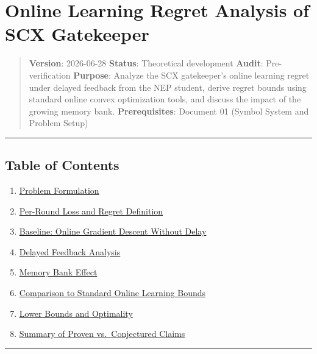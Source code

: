 \documentclass[
  12pt,
]{article}
\author{SCX}
\date{2026}
\providecommand{\tightlist}{%
  \setlength{\itemsep}{0pt}\setlength{\parskip}{0pt}}
\begin{document}
\section{Online Learning Regret Analysis of SCX
Gatekeeper}\label{online-learning-regret-analysis-of-scx-gatekeeper}

\begin{quote}
\textbf{Version}: 2026-06-28 \textbar{} \textbf{Status}: Theoretical
development \textbar{} \textbf{Audit}: Pre-verification
\textbf{Purpose}: Analyze the SCX gatekeeper's online learning regret
under delayed feedback from the NEP student, derive regret bounds using
standard online convex optimization tools, and discuss the impact of the
growing memory bank. \textbf{Prerequisites}: Document 01 (Symbol System
and Problem Setup)
\end{quote}

\begin{center}\rule{0.5\linewidth}{0.5pt}\end{center}

\subsection{Table of Contents}\label{table-of-contents}

\begin{enumerate}
\def\labelenumi{\arabic{enumi}.}
\tightlist
\item
  \hyperref[1-problem-formulation]{Problem Formulation}
\item
  \hyperref[2-per-round-loss-and-regret-definition]{Per-Round Loss and
  Regret Definition}
\item
  \hyperref[3-baseline-online-gradient-descent-without-delay]{Baseline:
  Online Gradient Descent Without Delay}
\item
  \hyperref[4-delayed-feedback-analysis]{Delayed Feedback Analysis}
\item
  \hyperref[5-memory-bank-effect]{Memory Bank Effect}
\item
  \hyperref[6-comparison-to-standard-online-learning-bounds]{Comparison
  to Standard Online Learning Bounds}
\item
  \hyperref[7-lower-bounds-and-optimality]{Lower Bounds and Optimality}
\item
  \hyperref[8-summary-of-proven-vs-conjectured-claims]{Summary of Proven
  vs.~Conjectured Claims}
\end{enumerate}

\begin{center}\rule{0.5\linewidth}{0.5pt}\end{center}
\end{document}

